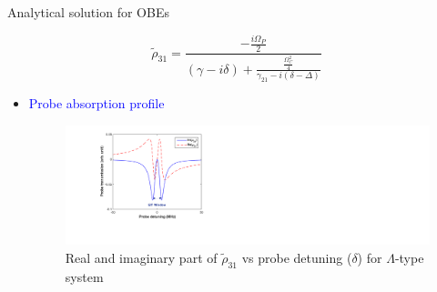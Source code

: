 \documentclass[9pt,aspectratio94]{beamer}
\begin{document}
\begin{frame}{Analytical solution for OBEs}

    \begin{center}
    \begin{tcolorbox}[width=7cm,arc=2mm,colback=blue!7 ]
            \begin{equation}
          \tilde{\rho}_{31}=\frac{-\frac{i\Omega_{P}}{2}}{(\gamma -i\delta)+\frac{\frac{\Omega_{C}^{2}}{4}}{\gamma_{21}-i(\delta-\Delta)}}\nonumber
          \label{eqn obe}
            \end{equation}
            
           \end{tcolorbox}  
           \end{center}

\begin{itemize}
    \item  {\textcolor{blue}{Probe absorption profile}}
       \begin{figure}
            \centering
        \includegraphics[scale=0.35]{Lambda(Analytical).png}
        \vspace{-1.5cm}
    \caption{Real and imaginary part of $\tilde\rho_{31}$ vs probe detuning ($\delta$) for $\Lambda$-type system }
     \label{fig:lambda_1}
 \end{figure}
          
 \end{itemize}
\end{frame}
\end{document}
